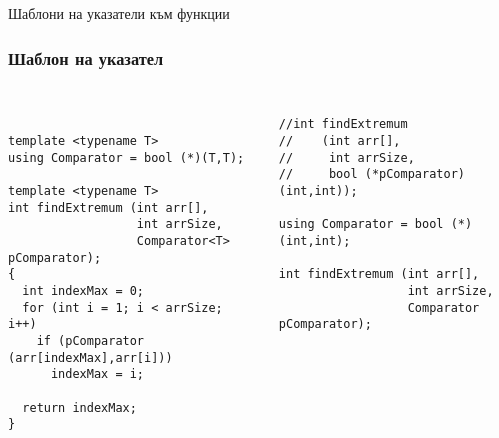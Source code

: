 \documentclass{beamer}
\begin{document}
\begin{frame}
\centerline{Шаблони на указатели към функции}
\end{frame}

\begin{frame}[fragile]
\frametitle{Шаблон на указател}





\begin{columns}[t]
  \begin{column}{0.55\textwidth}
\begin{flushleft}
\begin{lstlisting}


template <typename T>
using Comparator = bool (*)(T,T);

template <typename T>
int findExtremum (int arr[], 
                  int arrSize, 
                  Comparator<T> pComparator);
{
  int indexMax = 0;
  for (int i = 1; i < arrSize; i++)
    if (pComparator (arr[indexMax],arr[i]))
      indexMax = i;

  return indexMax;
}
\end{lstlisting}  
\end{flushleft}
  \end{column}
  \begin{column}{0.45\textwidth}
\begin{flushleft}
\begin{lstlisting}

//int findExtremum 
//    (int arr[], 
//     int arrSize, 
//     bool (*pComparator)(int,int));

using Comparator = bool (*)(int,int);

int findExtremum (int arr[], 
                  int arrSize, 
                  Comparator pComparator);

\end{lstlisting}  
\end{flushleft}
  \end{column}
\end{columns}


  


\end{frame}
\end{document}

